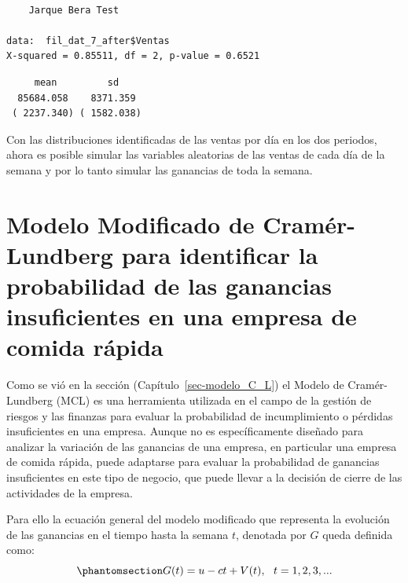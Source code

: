 \documentclass[
  us-letterpaper,
]{scrreprt}
\newenvironment{Shaded}{\begin{snugshade}}{\end{snugshade}}
\newcommand{\CommentTok}[1]{\textcolor[rgb]{0.37,0.37,0.37}{#1}}
\newcommand{\FunctionTok}[1]{\textcolor[rgb]{0.28,0.35,0.67}{#1}}
\newcommand{\NormalTok}[1]{\textcolor[rgb]{0.00,0.23,0.31}{#1}}
\newcommand{\SpecialCharTok}[1]{\textcolor[rgb]{0.37,0.37,0.37}{#1}}
\newcommand{\StringTok}[1]{\textcolor[rgb]{0.13,0.47,0.30}{#1}}
\theoremstyle{plain}
\theoremstyle{plain}
\theoremstyle{definition}
\theoremstyle{remark}
\begin{document}
\begin{verbatim}

    Jarque Bera Test

data:  fil_dat_7_after$Ventas
X-squared = 0.85511, df = 2, p-value = 0.6521
\end{verbatim}

\begin{Shaded}
\end{Shaded}

\begin{verbatim}
     mean         sd    
  85684.058    8371.359 
 ( 2237.340) ( 1582.038)
\end{verbatim}

Con las distribuciones identificadas de las ventas por día en los dos
periodos, ahora es posible simular las variables aleatorias de las
ventas de cada día de la semana y por lo tanto simular las ganancias de
toda la semana.

\section{Modelo Modificado de Cramér-Lundberg para identificar la
probabilidad de las ganancias insuficientes en una empresa de comida
rápida}\label{modelo-modificado-de-cramuxe9r-lundberg-para-identificar-la-probabilidad-de-las-ganancias-insuficientes-en-una-empresa-de-comida-ruxe1pida}

Como se vió en la sección (Capítulo~\ref{sec-modelo_C_L}) el Modelo de
Cramér-Lundberg (MCL) es una herramienta utilizada en el campo de la
gestión de riesgos y las finanzas para evaluar la probabilidad de
incumplimiento o pérdidas insuficientes en una empresa. Aunque no es
específicamente diseñado para analizar la variación de las ganancias de
una empresa, en particular una empresa de comida rápida, puede adaptarse
para evaluar la probabilidad de ganancias insuficientes en este tipo de
negocio, que puede llevar a la decisión de cierre de las actividades de
la empresa.

Para ello la ecuación general del modelo modificado que representa la
evolución de las ganancias en el tiempo hasta la semana \(t\), denotada
por \(G\) queda definida como:
\begin{equation}\phantomsection\label{eq-4.1pdf}{G(t) = u -ct + V(t), \ \ t = 1, 2, 3, ...}\end{equation}
\end{document}
